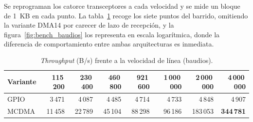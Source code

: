 Se reprograman los catorce transceptores a cada velocidad y se
mide un bloque de 1~KB en cada punto. La tabla~\ref{tab:bench_baudios} recoge los siete puntos del
barrido, omitiendo la variante DMA14 por carecer de lazo de recepción, y la
figura~\ref{fig:bench_baudios} los representa en escala logarítmica, donde la diferencia de
comportamiento entre ambas arquitecturas es inmediata.

\begin{table}[H]
    \centering
    \begin{tabular}{lrrrrrrr}
        \hline
        \textbf{Variante} & \textbf{115\,200} & \textbf{230\,400} & \textbf{460\,800} & \textbf{921\,600} & \textbf{1\,000\,000} & \textbf{2\,000\,000} & \textbf{4\,000\,000} \\
        \hline
        GPIO  & 3\,471 & 4\,087 & 4\,485 & 4\,714 & 4\,733 & 4\,848 & 4\,907 \\
        MCDMA & 11\,458 & 22\,789 & 45\,104 & 88\,298 & 96\,186 & 183\,053 & \textbf{344\,781} \\
        \hline
    \end{tabular}
    \caption{\textit{Throughput} (B/s) frente a la velocidad de línea (baudios).}
    \label{tab:bench_baudios}
\end{table}

